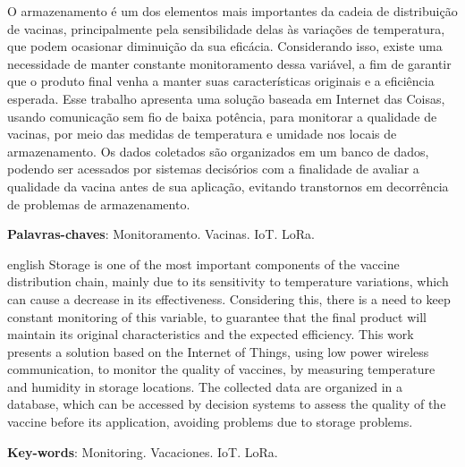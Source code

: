 \setlength{\absparsep}{18pt} %
\begin{resumo}
  O armazenamento é um dos elementos mais importantes da cadeia de distribuição de vacinas, principalmente pela sensibilidade delas às variações de temperatura, que podem ocasionar diminuição da sua eficácia. Considerando isso, existe uma necessidade de manter constante monitoramento dessa variável, a fim de garantir que o produto final venha a manter suas características originais e a eficiência esperada. Esse trabalho apresenta uma solução baseada em Internet das Coisas, usando comunicação sem fio de baixa potência, para monitorar a qualidade de vacinas, por meio das medidas de temperatura e umidade nos locais de armazenamento. Os dados coletados são organizados em um banco de dados, podendo ser acessados por sistemas decisórios com a finalidade de avaliar a qualidade da vacina antes de sua aplicação, evitando transtornos em decorrência de problemas de armazenamento.

  \textbf{Palavras-chaves}: Monitoramento. Vacinas. IoT. LoRa.
\end{resumo}

\begin{resumo}[Abstract]
  \begin{otherlanguage*}{english}
    Storage is one of the most important components of the vaccine distribution chain, mainly due to its sensitivity to temperature variations, which can cause a decrease in its effectiveness. Considering this, there is a need to keep constant monitoring of this variable, to guarantee that the final product will maintain its original characteristics and the expected efficiency. This work presents a solution based on the Internet of Things, using low power wireless communication, to monitor the quality of vaccines, by measuring temperature and humidity in storage locations. The collected data are organized in a database, which can be accessed by decision systems to assess the quality of the vaccine before its application, avoiding problems due to storage problems.

    \noindent
    \textbf{Key-words}: Monitoring. Vacaciones. IoT. LoRa.
  \end{otherlanguage*}
\end{resumo}
